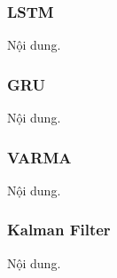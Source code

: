 \subsubsection{LSTM}
Nội dung.



\subsubsection{GRU}
Nội dung.




\subsubsection{VARMA}
Nội dung.




\subsubsection{Kalman Filter}
Nội dung.





